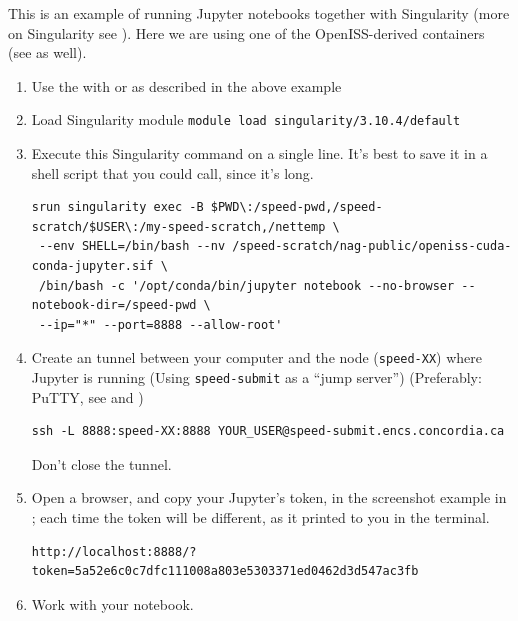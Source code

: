 This is an example of running Jupyter notebooks together with Singularity
(more on Singularity see ).
Here we are using one of the OpenISS-derived containers (see  as well).

\begin{enumerate}
\item
Use the  with  or  as described in the above example

\item
Load Singularity module
\verb+module load singularity/3.10.4/default+

\item
Execute this Singularity command on a single line. It's best to save it in a shell script
that you could call, since it's long.
\scriptsize
\begin{verbatim}
srun singularity exec -B $PWD\:/speed-pwd,/speed-scratch/$USER\:/my-speed-scratch,/nettemp \
 --env SHELL=/bin/bash --nv /speed-scratch/nag-public/openiss-cuda-conda-jupyter.sif \
 /bin/bash -c '/opt/conda/bin/jupyter notebook --no-browser --notebook-dir=/speed-pwd \
 --ip="*" --port=8888 --allow-root'
\end{verbatim}
\normalsize

\item
Create an  tunnel between your computer and the node (\texttt{speed-XX}) where Jupyter is
running (Using \texttt{speed-submit} as a ``jump server'') (Preferably: PuTTY, see  and )
\begin{verbatim}
ssh -L 8888:speed-XX:8888 YOUR_USER@speed-submit.encs.concordia.ca
\end{verbatim}
Don't close the tunnel.

\item
Open a browser, and copy your Jupyter's token, in the screenshot
example in ; each time the token will be different,
as it printed to you in the terminal.

\small
\begin{verbatim}
http://localhost:8888/?token=5a52e6c0c7dfc111008a803e5303371ed0462d3d547ac3fb
\end{verbatim}
\normalsize

\item
Work with your notebook.

\end{enumerate}

